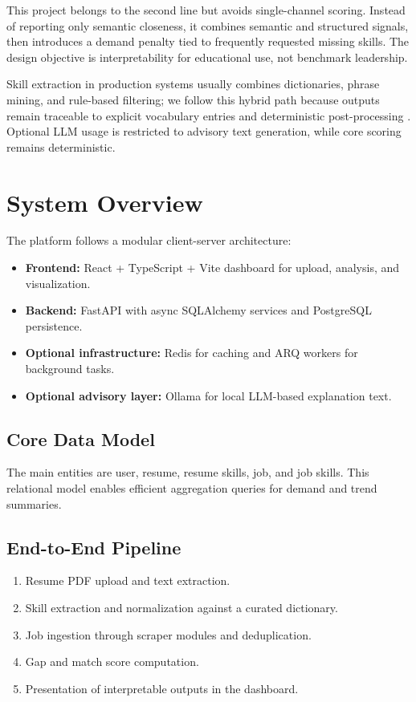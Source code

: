 \documentclass[conference]{IEEEtran}
\begin{document}
This project belongs to the second line but avoids single-channel scoring. Instead of reporting only semantic closeness, it combines semantic and structured signals, then introduces a demand penalty tied to frequently requested missing skills. The design objective is interpretability for educational use, not benchmark leadership.

Skill extraction in production systems usually combines dictionaries, phrase mining, and rule-based filtering; we follow this hybrid path because outputs remain traceable to explicit vocabulary entries and deterministic post-processing \cite{b3}. Optional LLM usage is restricted to advisory text generation, while core scoring remains deterministic.

\section{System Overview}
The platform follows a modular client-server architecture:
\begin{itemize}
    \item \textbf{Frontend:} React + TypeScript + Vite dashboard for upload, analysis, and visualization.
    \item \textbf{Backend:} FastAPI with async SQLAlchemy services and PostgreSQL persistence.
    \item \textbf{Optional infrastructure:} Redis for caching and ARQ workers for background tasks.
    \item \textbf{Optional advisory layer:} Ollama for local LLM-based explanation text.
\end{itemize}

\subsection{Core Data Model}
The main entities are user, resume, resume skills, job, and job skills. This relational model enables efficient aggregation queries for demand and trend summaries.

\subsection{End-to-End Pipeline}
\begin{enumerate}
    \item Resume PDF upload and text extraction.
    \item Skill extraction and normalization against a curated dictionary.
    \item Job ingestion through scraper modules and deduplication.
    \item Gap and match score computation.
    \item Presentation of interpretable outputs in the dashboard.
\end{enumerate}
\end{document}
